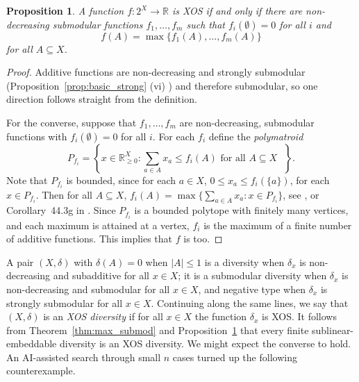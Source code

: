 \documentclass{article}
\theoremstyle{plain}
\newtheorem{proposition}[theorem]{Proposition}
\theoremstyle{definition}
\renewcommand{\Re}{\mathbb{R}}
\begin{document}
\begin{proposition} \label{prop:XOS}
A function $f:2^X \rightarrow \Re$ is XOS if and only if there are non-decreasing submodular functions $f_1,\ldots,f_m$ such that $f_i(\emptyset) = 0$ for all $i$ and 
\[f(A) = \max\{f_1(A),\ldots,f_m(A)\}\]
for all $A \subseteq X$.
\end{proposition}
\begin{proof}
Additive functions are non-decreasing and strongly submodular (Proposition~\ref{prop:basic_strong} (vi) ) and therefore submodular, so one direction follows straight from the definition. 

For the converse, suppose that $f_1,\ldots,f_m$ are non-decreasing, submodular functions with $f_i(\emptyset) = 0$ for all $i$. For each $f_i$ define the {\em polymatroid}
\[P_{f_i} = \left\{x \in \Re_{\geq 0}^X: \sum_{a \in A} x_a  \leq f_i(A) \mbox{ for all $A \subseteq X$ } \right\}.\]
Note that $P_{f_i}$ is bounded, since for each $a \in X$, $0 \leq x_a \leq f_i(\{a\})$, for each $x \in P_{f_i}$.
Then for all $A \subseteq X$, $f_i(A) = \max \{ \sum_{a \in A} x_a : x \in P_{f_i} \}$, see \cite{Lovasz1983}, or Corollary~44.3g in \cite{Schrijver2003}. Since $P_{f_i}$ is a bounded polytope with finitely many vertices, and each maximum is attained at a vertex, $f_i$ is the maximum of a finite number of additive functions. This implies that $f$ is too.
\end{proof}

A pair $(X,\delta)$ with $\delta(A) = 0$ when $|A| \leq 1$ is a diversity when $\delta_x$ is non-decreasing and subadditive for all $x \in X$; it is a submodular diversity when $\delta_x$ is non-decreasing and submodular for all $x \in X$,  and negative type when $\delta_x$ is strongly submodular for all $x \in X$. Continuing along the same lines, we say that $(X,\delta)$ is an {\em XOS diversity} if for all $x \in X$ the function $\delta_x$ is  XOS. It follows from Theorem~\ref{thm:max_submod} and Proposition~\ref{prop:XOS} that every finite sublinear-embeddable diversity is an XOS diversity. We might expect the converse to hold. An AI-assisted search through small $n$ cases turned up the following counterexample. 
\end{document}
